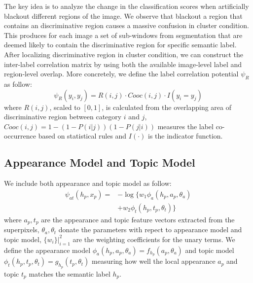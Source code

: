 The key idea is to analyze the change in the classification scores when artificially blackout different regions of the image. We observe that blackout a region that contains an discriminative region causes a massive confusion in cluster condition. This produces for each image a set of sub-windows from segmentation that are deemed likely to contain the discriminative region for specific semantic label. After localizing discriminative region in cluster condition, we can construct the inter-label correlation matrix by using both the available image-level label and region-level overlap. More concretely, we define the label correlation potential $\psi_R$ as follow:
\begin{equation}
    \psi_{R}(y_i,y_j) = R(i,j) \cdot Cooc(i,j) \cdot I(y_i=y_j)
\end{equation}
where $R(i,j)$, scaled to $[0,1]$, is calculated from the overlapping area of discriminative region between category $i$ and $j$, $Cooc(i,j) = 1-(1-P(i|j))(1-P(j|i))$ measures the label co-occurrence based on statistical rules and $I(\cdot)$ is the indicator function.

\subsection{Appearance Model and Topic Model}

We include both appearance and topic model as follow:
\begin{equation}
    \begin{aligned}
        \psi_{at}(h_p,x_p) = &- \log \big\{ w_1\phi_a(h_p,a_p,\theta_a) \\
        &+ w_2\phi_t(h_p,t_p,\theta_t) \big\}
    \end{aligned}
\end{equation}
where $a_p, t_p$ are the appearance and topic feature vectors extracted from the superpixels, $\theta_a, \theta_t$ donate the parameters with repect to appearance model and topic model, $\{w_i\}|_{i=1}^2$ are the weighting coefficients for the unary terms. We define the appearance model $\phi_a(h_p,a_p,\theta_a) = f_{h_p}(a_p,\theta_a)$ and topic model $\phi_t(h_p,t_p,\theta_t) = g_{h_p}(t_p,\theta_t)$ measuring how well the local appearance $a_p$ and topic $t_p$ matches the semantic label $h_p$.

